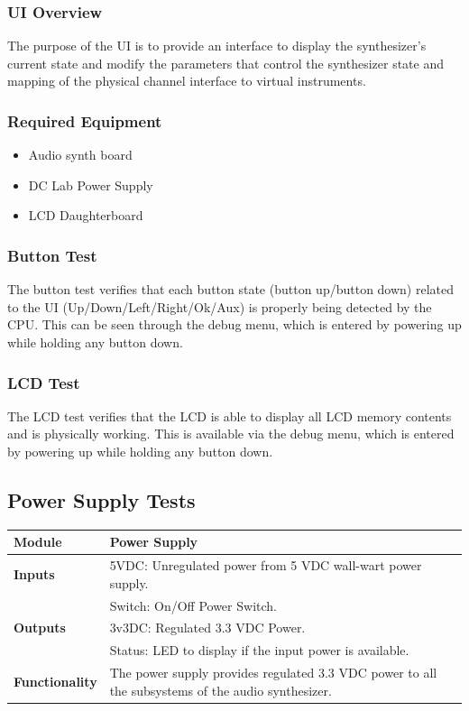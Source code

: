 \documentclass{article}
\begin{document}
\subsubsection{UI Overview}
The purpose of the UI is to provide an interface to display the synthesizer's current state and modify the parameters that control the synthesizer state and mapping of the physical channel interface to virtual instruments. 
\subsubsection{Required Equipment}
\begin{itemize}
\item Audio synth board
\item DC Lab Power Supply
\item LCD Daughterboard
\end{itemize}
\subsubsection{Button Test}
The button test verifies that each button state (button up/button down) related to the UI (Up/Down/Left/Right/Ok/Aux) is properly being detected by the CPU. This can be seen through the debug menu, which is entered by powering up while holding any button down. 
\subsubsection{LCD Test}
The LCD test verifies that the LCD is able to display all LCD memory contents and is physically working. This is available via the debug menu, which is entered by powering up while holding any button down.

\subsection{Power Supply Tests}

\begin{tabular}{|p{1in}|p{5in}|}
\hline
\textbf{Module} & Power Supply \\
\hline
\textbf{Inputs}& 5VDC: Unregulated power from 5 VDC wall-wart power supply.\\
	     & Switch: On/Off Power Switch.\\
\hline
\textbf{Outputs}& 3v3DC: Regulated 3.3 VDC Power.\\
	      & Status: LED to display if the input power is available.\\ 
\hline
\textbf{Functionality}& The power supply provides regulated 3.3 VDC power to all the subsystems of the audio synthesizer.\\
\hline
\end{tabular}
\end{document}
